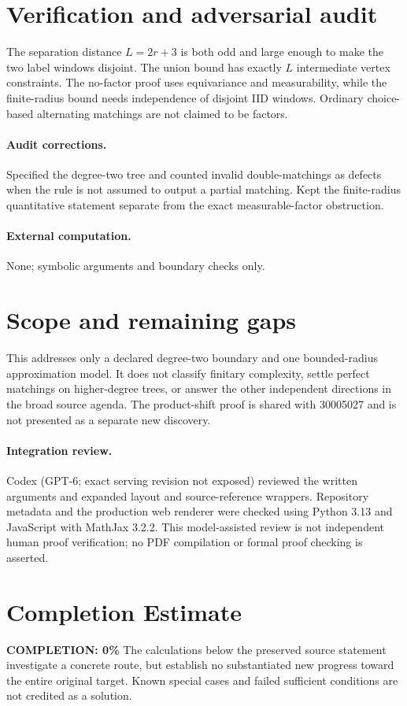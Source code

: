 \documentclass[11pt]{article}
\begin{document}
\section{Verification and adversarial audit}

The separation distance $L=2r+3$ is both odd and large enough to make the two
label windows disjoint. The union bound has exactly $L$ intermediate vertex
constraints. The no-factor proof uses equivariance and measurability, while the
finite-radius bound needs independence of disjoint IID windows. Ordinary
choice-based alternating matchings are not claimed to be factors.

\paragraph{Audit corrections.} Specified the degree-two tree and counted invalid double-matchings as
defects when the rule is not assumed to output a partial matching. Kept the
finite-radius quantitative statement separate from the exact measurable-factor
obstruction.
\paragraph{External computation.} None; symbolic arguments and boundary checks only.
\section{Scope and remaining gaps}

This addresses only a declared degree-two boundary and one bounded-radius
approximation model. It does not classify finitary complexity, settle perfect
matchings on higher-degree trees, or answer the other independent directions
in the broad source agenda. The product-shift proof is shared with 30005027
and is not presented as a separate new discovery.

\paragraph{Integration review.} Codex (GPT-6; exact serving revision not exposed) reviewed the written arguments and expanded layout and source-reference wrappers. Repository metadata and the production web renderer were checked using Python 3.13 and JavaScript with MathJax 3.2.2. This model-assisted review is not independent human proof verification; no PDF compilation or formal proof checking is asserted.

\section{Completion Estimate}
\noindent\textbf{COMPLETION: 0\%}
The calculations below the preserved source statement investigate a concrete route,
but establish no substantiated new progress toward the entire original target.
Known special cases and failed sufficient conditions are not credited as a solution.
\end{document}
